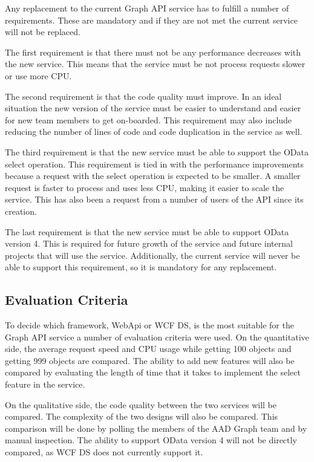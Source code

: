 \documentclass[se]{uw-wkrpt}
\begin{document}
Any replacement to the current Graph API service has to fulfill a number of requirements. These are mandatory and if they are not met the current service will not be replaced.

The first requirement is that there must not be any performance decreases with the new service. This means that the service must be not process requests slower or use more CPU. 

The second requirement is that the code quality must improve. In an ideal situation the new version of the service must be easier to understand and easier for new team members to get on-boarded. This requirement may also include reducing the number of lines of code and code duplication in the service as well.

The third requirement is that the new service must be able to support the OData select operation. This requirement is tied in with the performance improvements because a request with the select operation is expected to be smaller. A smaller request is faster to process and uses less CPU, making it easier to scale the service. This has also been a request from a number of users of the API since its creation.

The last requirement is that the new service must be able to support OData version 4. This is required for future growth of the service and future internal projects that will use the service. Additionally, the current service will never be able to support this requirement, so it is mandatory for any replacement.

\subsection{Evaluation Criteria}

To decide which framework, WebApi or WCF DS, is the most suitable for the Graph API service a number of evaluation criteria were used. On the quantitative side, the average request speed and CPU usage while getting 100 objects and getting 999 objects are compared. The ability to add new features will also be compared by evaluating the length of time that it takes to implement the select feature in the service.

On the qualitative side, the code quality between the two services will be compared. The complexity of the two designs will also be compared. This comparison will be done by polling the members of the AAD Graph team and by manual inspection. The ability to support OData version 4 will not be directly compared, as WCF DS does not currently support it.
\end{document}
